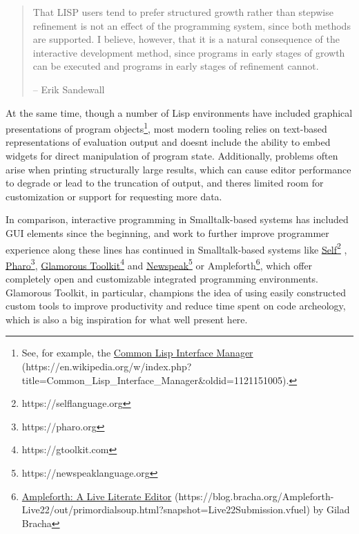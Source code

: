 \documentclass[sigconf,screen]{acmart}
\begin{document}
\begin{quote}
That LISP users tend to prefer structured growth rather than stepwise refinement is not an effect of the programming system, since both methods are supported. I believe, however, that it is a natural consequence of the interactive development method, since programs in early stages of growth can be executed and programs in early stages of refinement cannot. \cite{Sandewall_1978}

-- Erik Sandewall
\end{quote}

At the same time, though a number of Lisp environments have included graphical presentations of program objects\footnote{See, for example, the {\href{https://en.wikipedia.org/w/index.php?title=Common_Lisp_Interface_Manager\&oldid=1121151005}{Common Lisp Interface Manager} (https://en.wikipedia.org/w/index.php?title=Common\_Lisp\_Interface\_Manager\&oldid=1121151005)}.}, most modern tooling relies on text-based representations of evaluation output and doesn\textquotesingle t include the ability to embed widgets for direct manipulation of program state. Additionally, problems often arise when printing structurally large results, which can cause editor performance to degrade or lead to the truncation of output, and there\textquotesingle s limited room for customization or support for requesting more data.

In comparison, interactive programming in Smalltalk-based systems has included GUI elements since the beginning, and work to further improve programmer experience along these lines has continued in Smalltalk-based systems like {\href{https://selflanguage.org}{Self}\footnote{https://selflanguage.org}} \cite{Ungar_1987}, {\href{https://pharo.org}{Pharo}\footnote{https://pharo.org}}, {\href{https://gtoolkit.com}{Glamorous Toolkit}\footnote{https://gtoolkit.com}} \cite{Chi__2015} and {\href{https://newspeaklanguage.org}{Newspeak}\footnote{https://newspeaklanguage.org}} or Ampleforth\footnote{{\href{https://blog.bracha.org/Ampleforth-Live22/out/primordialsoup.html?snapshot=Live22Submission.vfuel}{Ampleforth: A Live Literate Editor} (https://blog.bracha.org/Ampleforth-Live22/out/primordialsoup.html?snapshot=Live22Submission.vfuel)} by Gilad Bracha}, which offer completely open and customizable integrated programming environments. Glamorous Toolkit, in particular, champions the idea of using easily constructed custom tools to improve productivity and reduce time spent on code archeology, which is also a big inspiration for what we\textquotesingle ll present here.
\end{document}
